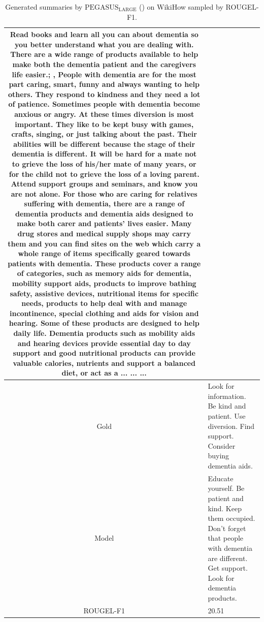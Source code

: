 \begin{table}[bth!]
\begin{tabular}{c|p{}}
Read books and learn all you can about dementia so you better understand what you are dealing with. There are a wide range of products available to help make both the dementia patient and the caregivers life easier.; , People with dementia are for the most part caring, smart, funny and always wanting to help others. They respond to kindness and they need a lot of patience. Sometimes people with dementia become anxious or angry. At these times diversion is most important. They like to be kept busy with games, crafts, singing, or just talking about the past. Their abilities will be different because the stage of their dementia is different. It will be hard for a mate not to grieve the loss of his/her mate of many years, or for the child not to grieve the loss of a loving parent. Attend support groups and seminars, and know you are not alone. For those who are caring for relatives suffering with dementia, there are a range of dementia products and dementia aids designed to make both carer and patients' lives easier. Many drug stores and medical supply shops may carry them and you can find sites on the web which carry a whole range of items specifically geared towards patients with dementia. These products cover a range of categories, such as memory aids for dementia, mobility support aids, products to improve bathing safety, assistive devices, nutritional items for specific needs, products to help deal with and manage incontinence, special clothing and aids for vision and hearing. Some of these products are designed to help daily life. Dementia products such as mobility aids and hearing devices provide essential day to day support and good nutritional products can provide valuable calories, nutrients and support a balanced diet, or act as a ... ... ... 
\\ \hline
Gold & 
Look for information. Be kind and patient. Use diversion. Find support. Consider buying dementia aids.
\\ \hline
Model & 
Educate yourself. Be patient and kind. Keep them occupied. Don't forget that people with dementia are different. Get support. Look for dementia products.
\\ \hline
ROUGEL-F1 & 
20.51
\\ \hline
\end{tabular}
\caption{Generated summaries by $\text{PEGASUS}_{\text{LARGE}}$ (\gnews) on WikiHow sampled by ROUGEL-F1.}
\end{table}
